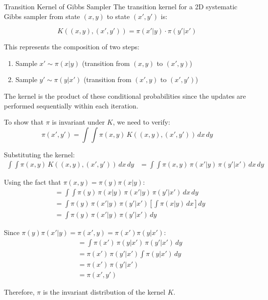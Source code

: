 \begin{frame}{Transition Kernel of Gibbs Sampler}
    The transition kernel for a 2D systematic Gibbs sampler from state $(x,y)$ to state $(x',y')$ is:

    \begin{equation*}
        K((x,y), (x',y')) = \pi(x'|y) \cdot \pi(y'|x')
    \end{equation*}

    This represents the composition of two steps:
    \begin{enumerate}
        \item Sample $x' \sim \pi(x|y)$ (transition from $(x,y)$ to $(x',y)$)
        \item Sample $y' \sim \pi(y|x')$ (transition from $(x',y)$ to $(x',y')$)
    \end{enumerate}

    \vspace{0.5cm}
    The kernel is the product of these conditional probabilities since the updates are performed sequentially within each iteration.
\end{frame}

\begin{frame}
To show that $\pi$ is invariant under $K$, we need to verify:
\begin{equation}
\pi(x',y') = \int \int \pi(x,y) \, K((x,y), (x',y')) \, dx \, dy
\end{equation}

Substituting the kernel:
\begin{align}
\int \int \pi(x,y) \, K((x,y), (x',y')) \, dx \, dy &= \int \int \pi(x,y) \, \pi(x'|y) \, \pi(y'|x') \, dx \, dy
\end{align}

Using the fact that $\pi(x,y) = \pi(y) \pi(x|y)$:
\begin{align}
&= \int \int \pi(y) \, \pi(x|y) \, \pi(x'|y) \, \pi(y'|x') \, dx \, dy\\
&= \int \pi(y) \, \pi(x'|y) \, \pi(y'|x') \left[ \int \pi(x|y) \, dx \right] dy\\
&= \int \pi(y) \, \pi(x'|y) \, \pi(y'|x') \, dy
\end{align}

Since $\pi(y) \pi(x'|y) = \pi(x',y) = \pi(x') \pi(y|x')$:
\begin{align}
&= \int \pi(x') \, \pi(y|x') \, \pi(y'|x') \, dy\\
&= \pi(x') \, \pi(y'|x') \int \pi(y|x') \, dy\\
&= \pi(x') \, \pi(y'|x')\\
&= \pi(x',y')
\end{align}

Therefore, $\pi$ is the invariant distribution of the kernel $K$.
\end{frame}